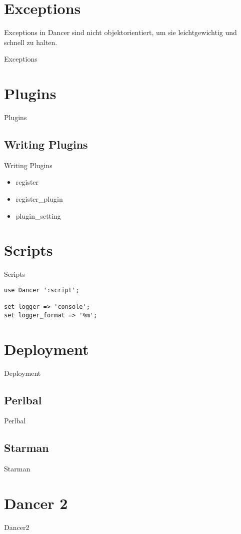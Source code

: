 \section{Exceptions}
Exceptions in Dancer sind nicht objektorientiert, um sie
leichtgewichtig und schnell zu halten.
\begin{frame}{Exceptions}
\end{frame}

\section{Plugins}
\begin{frame}{Plugins}
\end{frame}

\subsection{Writing Plugins}
\begin{frame}{Writing Plugins}
\begin{itemize}
\item register
\item register\_plugin
\item plugin\_setting
\end{itemize}
\end{frame}

\section{Scripts}
\begin{frame}[fragile]{Scripts}
\begin{lstlisting}
use Dancer ':script';

set logger => 'console';
set logger_format => '%m';
\end{lstlisting}
\end{frame}

\section{Deployment}
\begin{frame}{Deployment}
\end{frame}

\subsection{Perlbal}
\begin{frame}{Perlbal}
\end{frame}

\subsection{Starman}
\begin{frame}{Starman}
\end{frame}

\section{Dancer 2}
\begin{frame}{Dancer2}
\end{frame}


